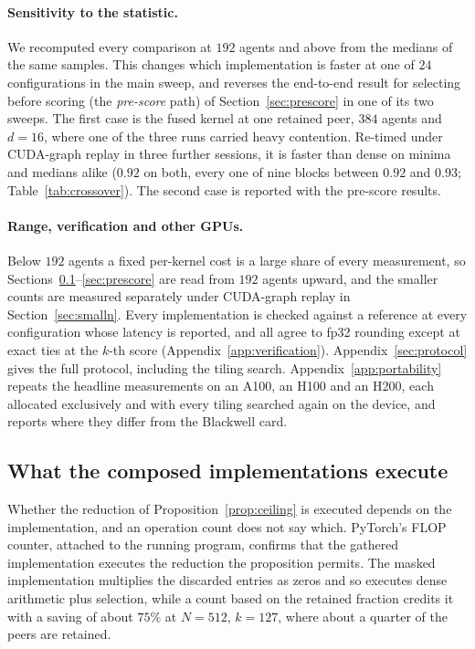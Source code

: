 \paragraph{Sensitivity to the statistic.} We recomputed every comparison at
$192$ agents and above from the medians of the same samples. This changes which
implementation is faster at one of $24$ configurations in the main sweep, and
reverses the end-to-end result for selecting before scoring (the \emph{pre-score}
path) of Section~\ref{sec:prescore} in one of
its two sweeps. The first case is the fused kernel at one retained peer, $384$
agents and $d{=}16$, where one of the three runs carried heavy contention.
Re-timed under CUDA-graph replay in three further sessions, it is faster than
dense on minima and medians alike ($0.92$ on both, every one of nine blocks
between $0.92$ and $0.93$; Table~\ref{tab:crossover}). The second case is
reported with the pre-score results.

\paragraph{Range, verification and other GPUs.} Below $192$ agents a fixed
per-kernel cost is a large share of every measurement, so
Sections~\ref{sec:composed}--\ref{sec:prescore} are read from $192$ agents
upward, and the smaller counts are measured separately under CUDA-graph replay
in Section~\ref{sec:smalln}. Every implementation is checked against a reference
at every configuration whose latency is reported, and all agree to fp32
rounding except at exact ties at the $k$-th score
(Appendix~\ref{app:verification}). Appendix~\ref{sec:protocol} gives the full
protocol, including the tiling search. Appendix~\ref{app:portability} repeats
the headline measurements on an A100, an H100 and an H200, each allocated
exclusively and with every tiling searched again on the device, and reports
where they differ from the Blackwell card.

\subsection{What the composed implementations execute}
\label{sec:composed}

Whether the reduction of Proposition~\ref{prop:ceiling} is executed depends on
the implementation, and an operation count does not say which. PyTorch's FLOP
counter, attached to the running program, confirms that the gathered
implementation executes the reduction the proposition permits. The masked
implementation multiplies the discarded entries as zeros and so executes dense
arithmetic plus selection, while a count based on the retained fraction credits
it with a saving of about $75\%$ at $N{=}512$, $k{=}127$, where about a quarter
of the peers are retained.

